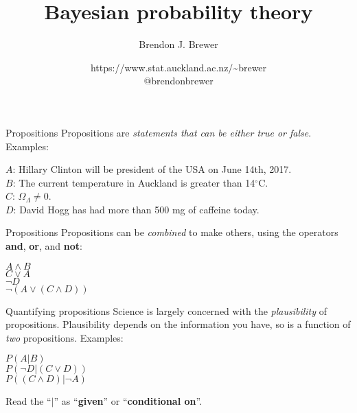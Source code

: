\documentclass{beamer}
\author{Brendon J. Brewer}
\title{Bayesian probability theory}
\institute{Department of Statistics, The University of Auckland}
\date{{\color{blue} https://www.stat.auckland.ac.nz/\~{ }brewer}\\
\vspace{10pt}
{\color{blue} @brendonbrewer}}
\begin{document}
\begin{frame}[t,plain]
\titlepage
\end{frame}

\begin{frame}[t]{Propositions}
Propositions are {\it statements that can be either true or false}.\\
Examples:\vspace{20pt}

$A$: {\small Hillary Clinton will be president of the USA on June 14th, 2017.}\\
$B$: {\small The current temperature in Auckland is greater than 14$^{\circ}$C.}\\
$C$: {\small $\Omega_\Lambda \neq 0$.}\\
$D$: {\small David Hogg has had more than 500 mg of caffeine today.}
\end{frame}

\begin{frame}[t]{Propositions}
Propositions can be {\it combined} to make others, using the operators
{\bf and}, {\bf or}, and {\bf not}: \vspace{20pt}

$A \wedge B$\\
$C \vee A$\\
$\neg D$\\
$\neg (A \vee (C \wedge D))$
\end{frame}

\begin{frame}[t]{Quantifying propositions}
Science is largely concerned with the {\it plausibility} of propositions.
Plausibility depends on the information you have, so is a function of {\it
two} propositions. Examples:\vspace{20pt}

$P(A | B)$\\
$P(\neg D | (C \vee D))$\\
$P((C \wedge D) | \neg A)$\vspace{20pt}


Read the ``$|$'' as ``{\bf given}'' or ``{\bf conditional on}''.
\end{frame}
\end{document}
